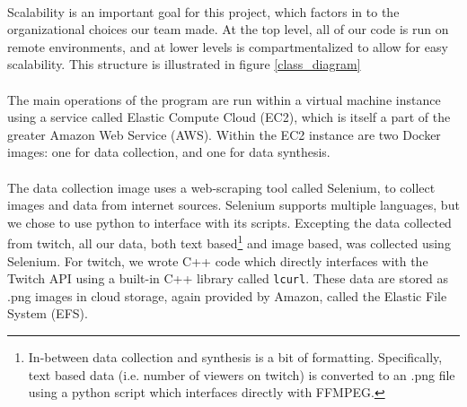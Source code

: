 \documentclass{article}
\begin{document}
  \paragraph{}
  Scalability is an important goal for this project, which factors in to the organizational choices our team made. At the top level, all of our code is run on remote environments, and at lower levels is compartmentalized to allow for easy scalability. This structure is illustrated in figure \ref{class_diagram}
  \paragraph{}
  The main operations of the program are run within a virtual machine instance using a service called Elastic Compute Cloud (EC2), which is itself a part of the greater Amazon Web Service (AWS). Within the EC2 instance are two Docker images: one for data collection, and one for data synthesis.
  \paragraph{}
  The data collection image uses a web-scraping tool called Selenium, to collect images and data from internet sources. Selenium supports multiple languages, but we chose to use python to interface with its scripts. Excepting the data collected from twitch, all our data, both text based\footnote{In-between data collection and synthesis is a bit of formatting. Specifically, text based data (i.e. number of viewers on twitch) is converted to an .png file using a python script which interfaces directly with FFMPEG.} and image based, was collected using Selenium. For twitch, we wrote C++ code which directly interfaces with the Twitch API using a built-in C++ library called \verb|lcurl|. These data are stored as .png images in cloud storage, again provided by Amazon, called the Elastic File System (EFS).
\end{document}
